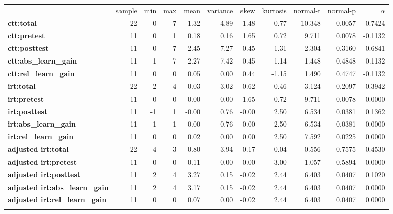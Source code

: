 \documentclass[]{article}
\begin{document}
\begin{longtable}[c]{@{}lrrrrrrrrrr@{}}
\toprule\addlinespace
& sample & min & max & mean & variance & skew & kurtosis & normal-t &
normal-p & $\alpha$
\\\addlinespace
\midrule\endhead
\textbf{ctt:total} & 22 & 0 & 7 & 1.32 & 4.89 & 1.48 & 0.77 & 10.348 &
0.0057 & 0.7424
\\\addlinespace
\textbf{ctt:pretest} & 11 & 0 & 1 & 0.18 & 0.16 & 1.65 & 0.72 & 9.711 &
0.0078 & -0.1132
\\\addlinespace
\textbf{ctt:posttest} & 11 & 0 & 7 & 2.45 & 7.27 & 0.45 & -1.31 & 2.304
& 0.3160 & 0.6841
\\\addlinespace
\textbf{ctt:abs\_learn\_gain} & 11 & -1 & 7 & 2.27 & 7.42 & 0.45 & -1.14
& 1.448 & 0.4848 & -0.1132
\\\addlinespace
\textbf{ctt:rel\_learn\_gain} & 11 & 0 & 0 & 0.05 & 0.00 & 0.44 & -1.15
& 1.490 & 0.4747 & -0.1132
\\\addlinespace
\textbf{irt:total} & 22 & -2 & 4 & -0.03 & 3.02 & 0.62 & 0.46 & 3.124 &
0.2097 & 0.3942
\\\addlinespace
\textbf{irt:pretest} & 11 & 0 & 0 & -0.00 & 0.00 & 1.65 & 0.72 & 9.711 &
0.0078 & 0.0000
\\\addlinespace
\textbf{irt:posttest} & 11 & -1 & 1 & -0.00 & 0.76 & -0.00 & 2.50 &
6.534 & 0.0381 & 0.1362
\\\addlinespace
\textbf{irt:abs\_learn\_gain} & 11 & -1 & 1 & -0.00 & 0.76 & -0.00 &
2.50 & 6.534 & 0.0381 & 0.0000
\\\addlinespace
\textbf{irt:rel\_learn\_gain} & 11 & 0 & 0 & 0.02 & 0.00 & 0.00 & 2.50 &
7.592 & 0.0225 & 0.0000
\\\addlinespace
\textbf{adjusted irt:total} & 22 & -4 & 3 & -0.80 & 3.94 & 0.17 & 0.04 &
0.556 & 0.7575 & 0.4530
\\\addlinespace
\textbf{adjusted irt:pretest} & 11 & 0 & 0 & 0.11 & 0.00 & 0.00 & -3.00
& 1.057 & 0.5894 & 0.0000
\\\addlinespace
\textbf{adjusted irt:posttest} & 11 & 2 & 4 & 3.27 & 0.15 & -0.02 & 2.44
& 6.403 & 0.0407 & 0.1020
\\\addlinespace
\textbf{adjusted irt:abs\_learn\_gain} & 11 & 2 & 4 & 3.17 & 0.15 &
-0.02 & 2.44 & 6.403 & 0.0407 & 0.0000
\\\addlinespace
\textbf{adjusted irt:rel\_learn\_gain} & 11 & 0 & 0 & 0.07 & 0.00 &
-0.02 & 2.44 & 6.403 & 0.0407 & 0.0000
\\\addlinespace
\bottomrule
\end{longtable}
\end{document}
